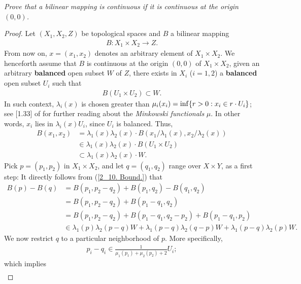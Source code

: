 \textit{%
Prove that a bilinear mapping is continuous %
if it is continuous at the origin $(0, 0)$.
}
\begin{proof}
Let $(X_1, X_2, Z)$ be topological spaces %
and $B$ a bilinear mapping %
%
\begin{align}
  B: X_1 \times X_2 \to Z. 
\end{align}
%
From now on, $x=(x_1, x_2)$ denotes an arbitrary element of %
%
  $X_1\times X_2$. %
%
We henceforth assume that $B$ is continuous at the origin %
%
  $(0, 0)$ of $X_1\times X_2$, \ie  %
%
given an arbitrary \textbf{balanced} open subset $W$ of $Z$, %
there exists in $X_i$ ($i=1, 2$) a \textbf{balanced} open subset $U_i$ %
such that %
%
\begin{align}
  B(U_1 \times U_2) \subset W .
\end{align}
%
In such context, %
%
  $\lambda_i(x) $ is chosen greater than %
  $\mu_i(x_i)=\inf\{r> 0: x_i \in r \cdot U_i\}$; %
%
see [1.33] of \cite{FA} for further reading about the %
\textit{Minkowski functionals} $\mu$. %
%
In other words, $x_i$ lies in $\lambda_i(x) U_i$, since $U_i$ is balanced. %
%
Thus, %
%
\begin{align}
  B(x_1, x_2) 
    & = 
      \lambda_1(x)\lambda_2(x) \cdot B(
        x_1/ \lambda_1(x), 
        x_2/ \lambda_2(x)) \\
    & \in 
  \lambda_1(x) \lambda_2(x) \cdot B(U_1 \times U_2) \\
    & \subset 
  \lambda_1(x) \lambda_2(x) \cdot W. \label{2_10. Bound.}
\end{align}
%
Pick $p=(p_1, p_2)$ in $X_1\times X_2$,  %
and let $ q=(q_1, q_2)$ range over $X \times Y$, as a first step: %
It directly follows from (\ref{2_10. Bound.}) that %
%
\begin{align}
  B(p) - B(q) &= B(p_1, p_2 - q_2) + B(p_1, q_2) - B(q_1, q_2)\\
  &= B(p_1, p_2 - q_2) + B(p_1-q_1, q_2)  \\
  &= B(p_1, p_2 - q_2) + B(p_1 -q_1, q_2 -p_2) + B(p_1-q_1,p_2) \\
  &\in  
     \lambda_1(p)   \lambda_2(p-q) W + 
     \lambda_1(p-q) \lambda_2(q-p) W + 
     \lambda_1(p-q) \lambda_2(p)   W.\label{2.10. In multiple of W.}
\end{align}
%
We now restrict $q$ to a particular neighborhood of $p$. %
More specifically, 
%
\begin{align}
  p_i - q_i \in \frac{1}{\mu_1(p_1) + \mu_2(p_2) + 2} U_i; 
\end{align}
%
which implies %
%
\begin{align}

\end{align}
\end{proof}
